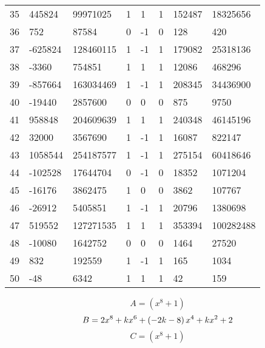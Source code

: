 \documentclass{amsart}
\begin{document}
\begin{longtable}{|l|l|l|lllll|}
35&445824&99971025&1&1&1&152487&18325656\\
36&752&87584&0&-1&0&128&420\\
37&-625824&128460115&1&-1&1&179082&25318136\\
38&-3360&754851&1&1&1&12086&468296\\
39&-857664&163034469&1&-1&1&208345&34436900\\
40&-19440&2857600&0&0&0&875&9750\\
41&958848&204609639&1&1&1&240348&46145196\\
42&32000&3567690&1&-1&1&16087&822147\\
43&1058544&254187577&1&-1&1&275154&60418646\\
44&-102528&17644704&0&-1&0&18352&1071204\\
45&-16176&3862475&1&0&0&3862&107767\\
46&-26912&5405851&1&-1&1&20796&1380698\\
47&519552&127271535&1&1&1&353394&100282488\\
48&-10080&1642752&0&0&0&1464&27520\\
49&832&192559&1&-1&1&165&1034\\
50&-48&6342&1&1&1&42&159\\
\hline
\end{longtable}
$$A=(x^8
 + 1)$$
$$B=2\*x^8
 + k\*x^6
 + \left(-2\*k
 - 8\right) \*x^4
 + k\*x^2
 + 2$$
$$C=(x^8
 + 1)$$
\end{document}
